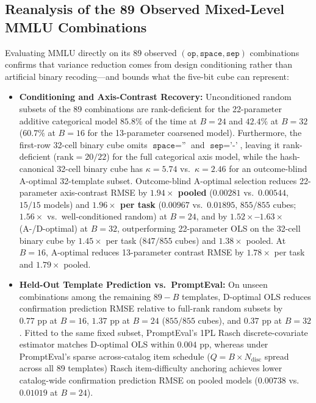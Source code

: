 \documentclass[11pt,a4paper]{article}
\begin{document}
\subsection{Reanalysis of the 89 Observed Mixed-Level MMLU Combinations}
Evaluating MMLU directly on its 89 observed $(\texttt{op}, \texttt{space}, \texttt{sep})$ combinations confirms that variance reduction comes from design conditioning rather than artificial binary recoding—and bounds what the five-bit cube can represent:
\begin{itemize}[leftmargin=*,nosep]
    \item \textbf{Conditioning and Axis-Contrast Recovery:} Unconditioned random subsets of the 89 combinations are rank-deficient for the 22-parameter additive categorical model $85.8\%$ of the time at $B=24$ and $42.4\%$ at $B=32$ ($60.7\%$ at $B=16$ for the 13-parameter coarsened model). Furthermore, the first-row 32-cell binary cube omits $\texttt{space}=\texttt{''}$ and $\texttt{sep}=\texttt{'-'}$, leaving it rank-deficient ($\mathrm{rank}=20/22$) for the full categorical axis model, while the hash-canonical 32-cell binary cube has $\kappa = 5.74$ vs.\ $\kappa = 2.46$ for an outcome-blind A-optimal 32-template subset. Outcome-blind A-optimal selection reduces 22-parameter axis-contrast RMSE by \textbf{$1.94\times$ pooled} ($0.00281$ vs.\ $0.00544$, $15/15$ models) and \textbf{$1.96\times$ per task} ($0.00967$ vs.\ $0.01895$, $855/855$ cubes; $1.56\times$ vs.\ well-conditioned random) at $B=24$, and by \textbf{$1.52\times$--$1.63\times$} (A-/D-optimal) at $B=32$, outperforming 22-parameter OLS on the 32-cell binary cube by $1.45\times$ per task ($847/855$ cubes) and $1.38\times$ pooled. At $B=16$, A-optimal reduces 13-parameter contrast RMSE by $1.78\times$ per task and $1.79\times$ pooled.
    \item \textbf{Held-Out Template Prediction vs.\ PromptEval:} On unseen combinations among the remaining $89-B$ templates, D-optimal OLS reduces confirmation prediction RMSE relative to full-rank random subsets by $0.77\text{ pp}$ at $B=16$, $1.37\text{ pp}$ at $B=24$ ($855/855$ cubes), and $0.37\text{ pp}$ at $B=32$. Fitted to the same fixed subset, PromptEval's 1PL Rasch discrete-covariate estimator matches D-optimal OLS within $0.004\text{ pp}$, whereas under PromptEval's sparse across-catalog item schedule ($Q = B \times N_{\mathrm{disc}}$ spread across all 89 templates) Rasch item-difficulty anchoring achieves lower catalog-wide confirmation prediction RMSE on pooled models ($0.00738$ vs.\ $0.01019$ at $B=24$).
\end{itemize}
\end{document}
